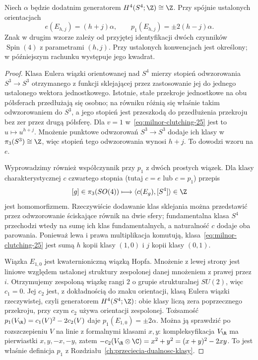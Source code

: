 \begin{stwierdzenie}
\label{prop:milnor-classes-25}
Niech $\alpha$ będzie dodatnim generatorem
$H^4(S^4;\Z)\cong\Z$. Przy spójnie
ustalonych orientacjach
\[
 e(E_{h,j})=(h+j)\alpha,\qquad
 p_1(E_{h,j})=\pm2(h-j)\alpha.
\]
Znak w drugim wzorze zależy od przyjętej
identyfikacji dwóch czynników $\operatorname{Spin}(4)$
z parametrami $(h,j)$. Przy ustalonych konwencjach
jest określony; w późniejszym rachunku
występuje jego kwadrat.
\end{stwierdzenie}
\begin{proof}
Klasa Eulera wiązki orientowanej
nad $S^4$ mierzy stopień
odwzorowania $S^3\to S^3$
otrzymanego z funkcji sklejającej
przez zastosowanie jej do jednego
ustalonego wektora jednostkowego.
Istotnie, stałe przekroje jednostkowe
na obu półsferach przedłużają się osobno;
na równiku różnią się właśnie takim
odwzorowaniem do $S^3$, a jego stopień
jest przeszkodą do przedłużenia
przekroju bez zer przez drugą półsferę.
Dla $v=1$ w~\eqref{eq:milnor-clutching-25}
jest to $u\mapsto u^{h+j}$.
Mnożenie punktowe odwzorowań
$S^3\to S^3$ dodaje ich klasy
w $\pi_3(S^3)\cong\Z$, więc stopień
tego odwzorowania wynosi $h+j$.
To dowodzi wzoru na $e$.

Wyprowadzimy również współczynnik przy $p_1$
z dwóch prostych wiązek. Dla klasy
charakterystycznej $c$ czwartego stopnia
(tutaj $c=e$ lub $c=p_1$)
przepis
\[
 [g]\in\pi_3(SO(4))\longmapsto
 \langle c(E_g),[S^4]\rangle\in\Z
\]
jest homomorfizmem. Rzeczywiście dodawanie
klas sklejania można przedstawić przez
odwzorowanie ściskające równik na dwie sfery;
fundamentalna klasa $S^4$ przechodzi wtedy
na sumę ich klas fundamentalnych, a
naturalność $c$ dodaje oba parowania.
Ponieważ lewa i prawa multiplikacja
komutują, klasa~\eqref{eq:milnor-clutching-25}
jest sumą $h$ kopii klasy $(1,0)$
i $j$ kopii klasy $(0,1)$.

Wiązka $E_{1,0}$ jest kwaternioniczną
wiązką Hopfa. Mnożenie z lewej strony
jest liniowe względem ustalonej struktury
zespolonej danej mnożeniem z prawej przez $i$.
Otrzymujemy zespoloną wiązkę rangi $2$
o grupie strukturalnej $SU(2)$, więc $c_1=0$.
Jej $c_2$ jest, z dokładnością do znaku
orientacji, klasą Eulera wiązki rzeczywistej,
czyli generatorem $H^4(S^4;\Z)$:
obie klasy liczą zera poprzecznego przekroju,
przy czym $c_2$ używa orientacji zespolonej.
Tożsamość
$p_1(V_{\R})=c_1(V)^2-2c_2(V)$
daje $p_1(E_{1,0})=\pm2\alpha$.
Można ją sprawdzić po rozszczepieniu
$V$ na linie z formalnymi klasami
$x,y$: kompleksyfikacja $V_{\R}$
ma pierwiastki $x,y,-x,-y$, zatem
$-c_2(V_{\R}\otimes\C)=x^2+y^2
=(x+y)^2-2xy$. To jest właśnie
definicja $p_1$ z
Rozdziału~\ref{ch:przeciecia-dualnosc-klasy}.


\end{proof}
